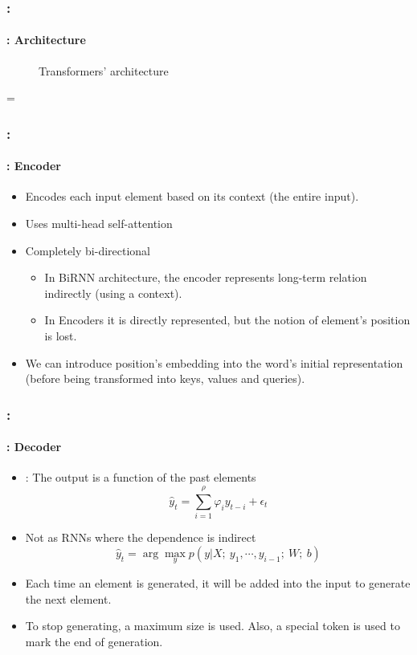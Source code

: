 \documentclass[xcolor=table]{beamer}
\begin{document}
\begin{frame}
	\frametitle{\insertshortsubtitle: \insertsection}
	\framesubtitle{\insertsubsection: Architecture}
	
	\begin{minipage}{0.49\textwidth}
		\begin{figure}
			\centering
			\caption{Transformers' architecture \cite{2017-vaswani-al}}
		\end{figure}
	\end{minipage}
	\begin{minipage}{0.1\textwidth}
		\Huge =
	\end{minipage}
	\begin{minipage}{0.39\textwidth}
	\end{minipage}
\end{frame}

\begin{frame}
	\frametitle{\insertshortsubtitle: \insertsection}
	\framesubtitle{\insertsubsection: Encoder}
	\begin{itemize}
		\item Encodes each input element based on its context (the entire input).
		\item Uses multi-head self-attention
		\item Completely bi-directional
		\begin{itemize}
			\item In BiRNN architecture, the encoder represents long-term relation indirectly (using a context).
			\item In Encoders it is directly represented, but the notion of element's position is lost.
		\end{itemize} 
		\item We can introduce position's embedding into the word's initial representation (before being transformed into keys, values and queries).
	\end{itemize}
\end{frame}

\begin{frame}
	\frametitle{\insertshortsubtitle: \insertsection}
	\framesubtitle{\insertsubsection: Decoder}
	\begin{itemize}
		\item {}: The output is a  function of the past elements
		\[\hat{y}_t = \sum_{i = 1}^{\rho} \varphi_{i} y_{t-i} + \epsilon_t\]
		\item Not as RNNs where the dependence is indirect
		\[\hat{y}_t = \arg\max_y p(y | X;\ y_1, \cdots, y_{i-1};\ W;\ b)\]
		\item Each time an element is generated, it will be added into the input to generate the next element.
		\item To stop generating, a maximum size is used. Also, a special token is used to mark the end of generation.
	\end{itemize}
\end{frame}
\end{document}
